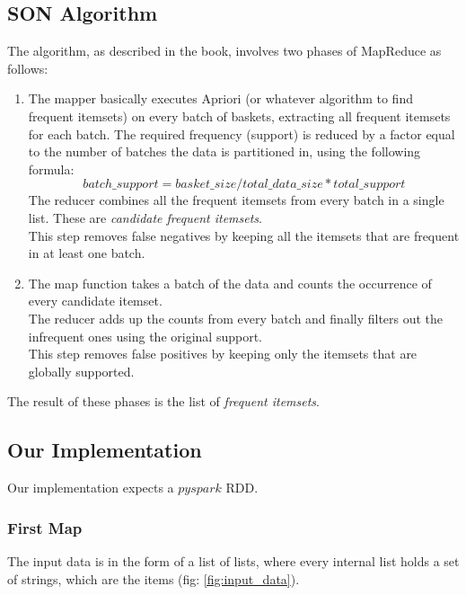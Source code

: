 \documentclass[a4paper]{article}
\begin{document}
	\subsection{SON Algorithm}	
	The algorithm, as described in the book, involves two phases of MapReduce as follows:
	\begin{enumerate}
	\item The mapper basically executes Apriori (or whatever algorithm to find frequent itemsets) on every batch of baskets, extracting all frequent itemsets for each batch. The required frequency (support) is reduced by a factor equal to the number of batches the data is partitioned in, using the following formula:
	\[ batch\_support = basket\_size / total\_data\_size * total\_support \]
	The reducer combines all the frequent itemsets from every batch in a single list. These are \textit{candidate frequent itemsets}.\\
	This step removes false negatives by keeping all the itemsets that are frequent in at least one batch.\\
	\item The map function takes a batch of the data and counts the occurrence of every candidate itemset.\\
	The reducer adds up the counts from every batch and finally filters out the infrequent ones using the original support.\\
	This step removes false positives by keeping only the itemsets that are globally supported.\\

	\end{enumerate}
	The result of these phases is the list of \textit{frequent itemsets}.
	
	\subsection{Our Implementation}
	Our implementation expects a $pyspark$ RDD.
	
	\subsubsection{First Map}
	The input data is in the form of a list of lists, where every internal list holds a set of strings, which are the items (fig: \ref{fig:input_data}).
	
\end{document}
